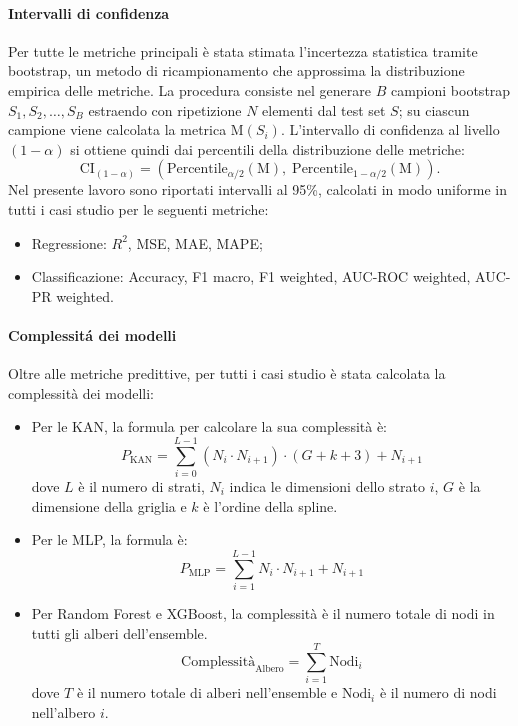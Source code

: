 \documentclass[a4paper,12pt]{report}
\begin{document}
	\paragraph{Intervalli di confidenza}  
	Per tutte le metriche principali è stata stimata l’incertezza statistica tramite bootstrap, un metodo di ricampionamento che approssima la distribuzione empirica delle metriche. La procedura consiste nel generare $B$ campioni bootstrap $S_1, S_2, \dots, S_B$ estraendo con ripetizione $N$ elementi dal test set $S$; su ciascun campione viene calcolata la metrica $\text{M}(S_i)$. L’intervallo di confidenza al livello $(1-\alpha)$ si ottiene quindi dai percentili della distribuzione delle metriche:  
	\[
	\text{CI}_{(1-\alpha)} = \left( \text{Percentile}_{\alpha/2}(\text{M}), \; \text{Percentile}_{1-\alpha/2}(\text{M}) \right).
	\]
	Nel presente lavoro sono riportati intervalli al 95\%, calcolati in modo uniforme in tutti i casi studio per le seguenti metriche:
	\begin{itemize}
		\item Regressione: $R^2$, MSE, MAE, MAPE;
		\item Classificazione: Accuracy, F1 macro, F1 weighted, AUC-ROC weighted, AUC-PR weighted.
	\end{itemize}
	
	\paragraph{Complessitá dei modelli}
	Oltre alle metriche predittive, per tutti i casi studio è stata calcolata la complessità dei modelli:
	\begin{itemize}
		\item Per le KAN, la formula per calcolare la sua complessità è:
		\[
		P_{\text{KAN}} = \sum_{i=0}^{L-1} (N_i \cdot N_{i+1}) \cdot (G+k+3) + N_{i+1}
		\]
		dove $L$ è il numero di strati, $N_i$ indica le dimensioni dello strato $i$, $G$ è la dimensione della griglia e $k$ è l'ordine della spline.
		
		\item Per le MLP, la formula è:
		\[
		P_{\text{MLP}} = \sum_{i=1}^{L-1} N_i \cdot N_{i+1} + N_{i+1}
		\]
		
		\item Per Random Forest e XGBoost, la complessità è il numero totale di nodi in tutti gli alberi dell'ensemble.
		\[
		\text{Complessità}_{\text{Albero}} = \sum_{i=1}^{T} \text{Nodi}_i
		\]
		dove $T$ è il numero totale di alberi nell'ensemble e $\text{Nodi}_i$ è il numero di nodi nell'albero $i$.
	\end{itemize}
	
\end{document}
